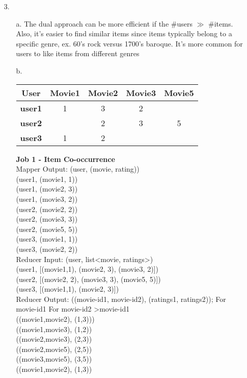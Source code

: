 \documentclass{article}
\begin{document}
\begin{itemize}
\pagebreak
\vspace{2cm}
\item[3.]
	\begin{itemize}
		\item[a.] The dual approach can be more efficient if the \#users $\gg$ \#items. Also, it's easier to find similar items since items typically belong to a specific genre, ex. 60's rock versus 1700's baroque. It's more common for users to like items from different genres
		\item[b.]
			\begin{tabular}{|c||c|c|c|c|}
			\hline 
				\textbf{User} & \textbf{Movie1} & \textbf{Movie2} & \textbf{Movie3} & \textbf{Movie5}\\
			\hline
				\textbf{user1} & 1 & 3 & 2 & \\
				\textbf{user2} &  & 2 & 3 & 5\\
				\textbf{user3} & 1 & 2 &  & \\
			\hline
			\end{tabular}
			
			\textbf{Job 1 - Item Co-occurrence} \\
			Mapper Output: (user, (movie, rating))\\
			(user1, (movie1, 1))\\
			(user1, (movie2, 3))\\
			(user1, (movie3, 2))\\
			(user2, (movie2, 2))\\
			(user2, (movie3, 3))\\
			(user2, (movie5, 5))\\
			(user3, (movie1, 1))\\
			(user3, (movie2, 2))\\
			
			Reducer Input: (user, list\textless movie, ratings\textgreater)\\
			(user1, [(movie1,1), (movie2, 3), (movie3, 2)])\\
			(user2, [(movie2, 2), (movie3, 3), (movie5, 5)])\\
			(user3, [(movie1,1), (movie2, 3)])\\
			
			Reducer Output: ((movie-id1, movie-id2), (ratings1, ratings2)); For movie-id1 {For movie-id2 \textgreater movie-id1} \\
			((movie1,movie2), (1,3)))\\
			((movie1,movie3), (1,2))\\
			((movie2,movie3), (2,3))\\
			((movie2,movie5), (2,5))\\
			((movie3,movie5), (3,5))\\
			((movie1,movie2), (1,3))\\
			  

\end{itemize}
\end{itemize}
\end{document}
